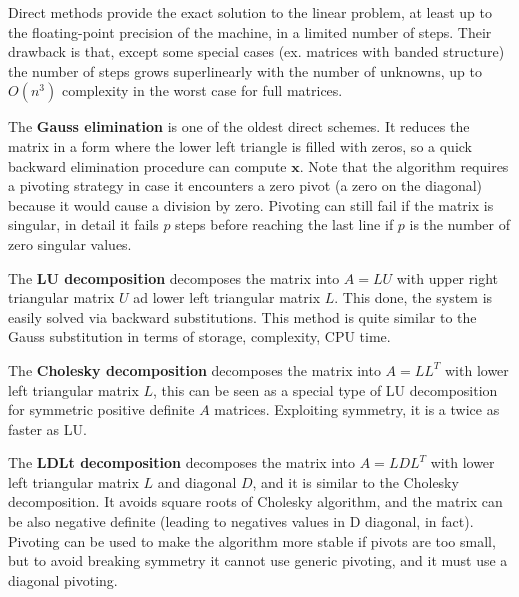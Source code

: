 \documentclass{digitaldynamics}
\def\vect#1{\bm{#1}}
\def\matr#1{{#1}}
\begin{document}
Direct methods provide the exact solution to the linear problem, at least up to the floating-point precision of the machine, in a limited number of steps.
Their drawback is that, except some special cases (ex. matrices with banded structure) the number of steps grows superlinearly with the number of unknowns, up to $O(n^3)$ complexity in the worst case for full matrices. 
 
The \textbf{Gauss elimination} is one of the oldest direct schemes. It reduces the matrix in a form where the lower left triangle is filled with zeros, so a quick backward elimination procedure can compute $\vect{x}$. 
Note that the algorithm requires a pivoting strategy in case it encounters a zero pivot (a zero on the diagonal) because it would cause a division by zero. Pivoting can still fail if the matrix is singular, in detail it fails $p$ steps before reaching the last line if $p$ is the number of zero singular values.

The \textbf{LU decomposition} decomposes the matrix into $\matr{A}=\matr{L} \matr{U}$ with upper right triangular matrix $\matr{U}$ ad lower left triangular matrix $\matr{L}$. This done, the system is easily solved via backward substitutions. This method is quite similar to the Gauss substitution in terms of storage, complexity, CPU time.

The \textbf{Cholesky decomposition} decomposes the matrix into $\matr{A}=\matr{L} \matr{L}^T$ with lower left triangular matrix $\matr{L}$, this can be seen as a special type of LU decomposition for symmetric positive definite $\matr{A}$ matrices. Exploiting symmetry, it is a twice as faster as LU. 

The \textbf{LDLt decomposition} decomposes the matrix into $\matr{A}=\matr{L} \matr{D} \matr{L}^T$ with lower left triangular matrix $\matr{L}$ and diagonal $\matr{D}$, and it is similar to the Cholesky decomposition. It avoids square roots of Cholesky algorithm, and the matrix can be also negative definite (leading to negatives values in D diagonal, in fact). Pivoting can be used to make the algorithm more stable if pivots are too small, but to avoid breaking symmetry it cannot use generic pivoting, and it must use a diagonal pivoting.
\end{document}
